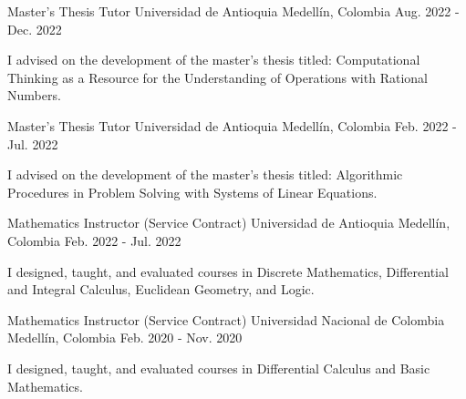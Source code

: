


\begin{cventries}


\cventry
{Master's Thesis Tutor} %
{Universidad de Antioquia} %
{Medellín, Colombia} %
{Aug. 2022 - Dec. 2022} %
{ %
\begin{cvitems}
\item {I advised on the development of the master's thesis titled: Computational Thinking as a Resource for the Understanding of Operations with Rational Numbers.\hfill \break}
\end{cvitems}
}


\cventry
{Master's Thesis Tutor} %
{Universidad de Antioquia} %
{Medellín, Colombia} %
{Feb. 2022 - Jul. 2022} %
{ %
\begin{cvitems}
\item {I advised on the development of the master's thesis titled: Algorithmic Procedures in Problem Solving with Systems of Linear Equations.\hfill \break}
\end{cvitems}
}


\cventry
{Mathematics Instructor (Service Contract)} %
{Universidad de Antioquia} %
{Medellín, Colombia} %
{Feb. 2022 - Jul. 2022} %
{ %
\begin{cvitems}
\item {I designed, taught, and evaluated courses in Discrete Mathematics, Differential and Integral Calculus, Euclidean Geometry, and Logic.\hfill \break}
\end{cvitems}
}


\cventry
{Mathematics Instructor (Service Contract)} %
{Universidad Nacional de Colombia} %
{Medellín, Colombia} %
{Feb. 2020 - Nov. 2020} %
{ %
\begin{cvitems}
\item {I designed, taught, and evaluated courses in Differential Calculus and Basic Mathematics.\hfill \break}
\end{cvitems}
}

\end{cventries}